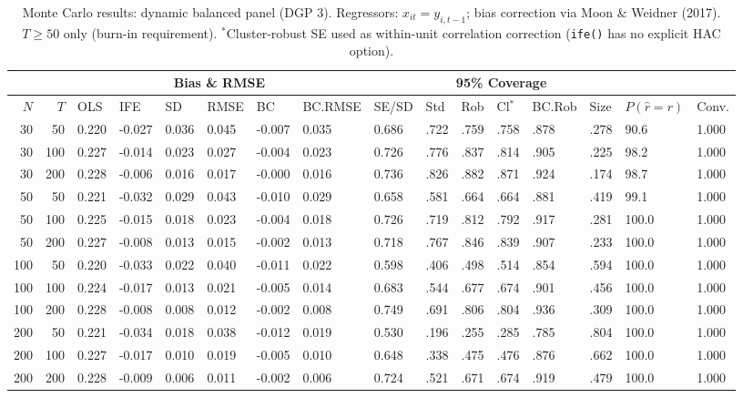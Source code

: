 \begin{table}[ht]
\centering
\caption{Monte Carlo results: dynamic balanced panel (DGP 3). Regressors: $x_{it} = y_{i,t-1}$; bias correction via Moon \& Weidner (2017). $T \geq 50$ only (burn-in requirement). $^*$Cluster-robust SE used as within-unit correlation correction (\texttt{ife()} has no explicit HAC option).} 
\label{tab:mc_dyn_bal}
\begin{tabular}{rrllllllllllllll}
  \hline
 & & \multicolumn{6}{c}{Bias \& RMSE} & & \multicolumn{4}{c}{95\% Coverage} & & & \\
\cline{3-8}\cline{10-13}
 \hline
$N$ & $T$ & OLS & IFE & SD & RMSE & BC & BC.RMSE & SE/SD & Std & Rob & Cl$^*$ & BC.Rob & Size & $P(\hat r=r)$ & Conv. \\ 
  \hline
30 & 50 & 0.220 & -0.027 & 0.036 & 0.045 & -0.007 & 0.035 & 0.686 & .722 & .759 & .758 & .878 & .278 & 90.6 & 1.000 \\ 
  30 & 100 & 0.227 & -0.014 & 0.023 & 0.027 & -0.004 & 0.023 & 0.726 & .776 & .837 & .814 & .905 & .225 & 98.2 & 1.000 \\ 
  30 & 200 & 0.228 & -0.006 & 0.016 & 0.017 & -0.000 & 0.016 & 0.736 & .826 & .882 & .871 & .924 & .174 & 98.7 & 1.000 \\ 
  50 & 50 & 0.221 & -0.032 & 0.029 & 0.043 & -0.010 & 0.029 & 0.658 & .581 & .664 & .664 & .881 & .419 & 99.1 & 1.000 \\ 
  50 & 100 & 0.225 & -0.015 & 0.018 & 0.023 & -0.004 & 0.018 & 0.726 & .719 & .812 & .792 & .917 & .281 & 100.0 & 1.000 \\ 
  50 & 200 & 0.227 & -0.008 & 0.013 & 0.015 & -0.002 & 0.013 & 0.718 & .767 & .846 & .839 & .907 & .233 & 100.0 & 1.000 \\ 
  100 & 50 & 0.220 & -0.033 & 0.022 & 0.040 & -0.011 & 0.022 & 0.598 & .406 & .498 & .514 & .854 & .594 & 100.0 & 1.000 \\ 
  100 & 100 & 0.224 & -0.017 & 0.013 & 0.021 & -0.005 & 0.014 & 0.683 & .544 & .677 & .674 & .901 & .456 & 100.0 & 1.000 \\ 
  100 & 200 & 0.228 & -0.008 & 0.008 & 0.012 & -0.002 & 0.008 & 0.749 & .691 & .806 & .804 & .936 & .309 & 100.0 & 1.000 \\ 
  200 & 50 & 0.221 & -0.034 & 0.018 & 0.038 & -0.012 & 0.019 & 0.530 & .196 & .255 & .285 & .785 & .804 & 100.0 & 1.000 \\ 
  200 & 100 & 0.227 & -0.017 & 0.010 & 0.019 & -0.005 & 0.010 & 0.648 & .338 & .475 & .476 & .876 & .662 & 100.0 & 1.000 \\ 
  200 & 200 & 0.228 & -0.009 & 0.006 & 0.011 & -0.002 & 0.006 & 0.724 & .521 & .671 & .674 & .919 & .479 & 100.0 & 1.000 \\ 
   \hline
\end{tabular}
\end{table}
